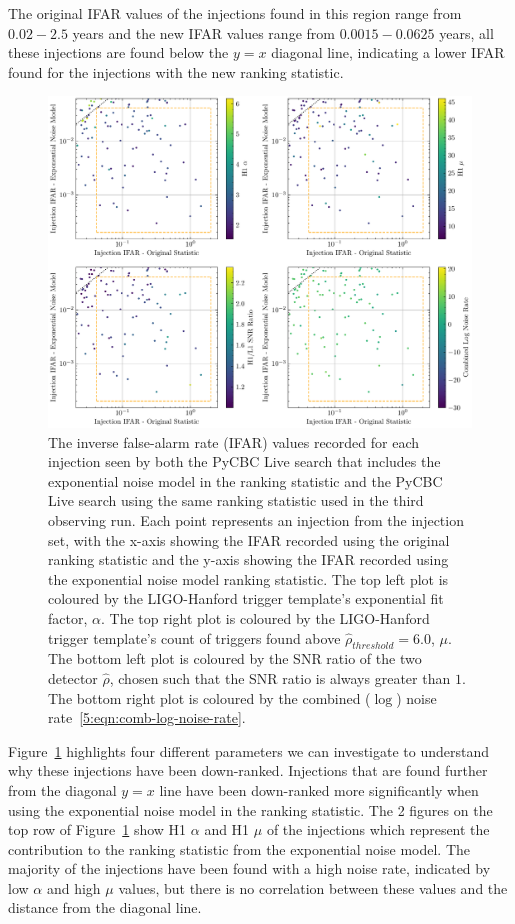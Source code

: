 %
The original IFAR values of the injections found in this region range from $0.02 - 2.5$ years and the new IFAR values range from $0.0015 - 0.0625$ years, all these injections are found below the $y = x$ diagonal line, indicating a lower IFAR found for the injections with the new ranking statistic. 
%
\begin{figure}
    \centering
    \includegraphics[width=1\textwidth]{images/5_pycbclive/plots/fits_only_ifar_vs_ifar_bottom_left_region_subplots.pdf}
    \caption{The inverse false-alarm rate (IFAR) values recorded for each injection seen by both the PyCBC Live search that includes the exponential noise model in the ranking statistic and the PyCBC Live search using the same ranking statistic used in the third observing run. Each point represents an injection from the injection set, with the x-axis showing the IFAR recorded using the original ranking statistic and the y-axis showing the IFAR recorded using the exponential noise model ranking statistic. The top left plot is coloured by the LIGO-Hanford trigger template's exponential fit factor, $\alpha$. The top right plot is coloured by the LIGO-Hanford trigger template's count of triggers found above $\hat{\rho}_{threshold} = 6.0$, $\mu$. The bottom left plot is coloured by the SNR ratio of the two detector $\hat{\rho}$, chosen such that the SNR ratio is always greater than $1$. The bottom right plot is coloured by the combined ($\log$) noise rate~\ref{5:eqn:comb-log-noise-rate}.}
    \label{5:fig:bottom-left-subplots}
\end{figure}
%
Figure~\ref{5:fig:bottom-left-subplots} highlights four different parameters we can investigate to understand why these injections have been down-ranked. Injections that are found further from the diagonal $y = x$ line have been down-ranked more significantly when using the exponential noise model in the ranking statistic. The 2 figures on the top row of Figure~\ref{5:fig:bottom-left-subplots} show H1 $\alpha$ and H1 $\mu$ of the injections which represent the contribution to the ranking statistic from the exponential noise model. The majority of the injections have been found with a high noise rate, indicated by low $\alpha$ and high $\mu$ values, but there is no correlation between these values and the distance from the diagonal line.


